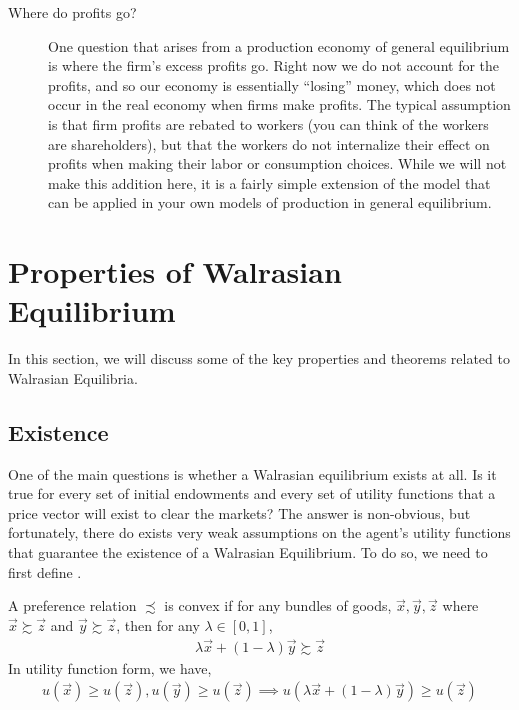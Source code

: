 \begin{description}
    \item[Where do profits go?] One question that arises from a production economy of general equilibrium is where the firm's excess profits go. Right now we do not account for the profits, and so our economy is essentially ``losing'' money, which does not occur in the real economy when firms make profits. The typical assumption is that firm profits are rebated to workers (you can think of the workers are shareholders), but that the workers do not internalize their effect on profits when making their labor or consumption choices. While we will not make this addition here, it is a fairly simple extension of the model that can be applied in your own models of production in general equilibrium.  
\end{description}

\section{Properties of Walrasian Equilibrium}
In this section, we will discuss some of the key properties and theorems related to Walrasian Equilibria.

\subsection*{Existence}
One of the main questions is whether a Walrasian equilibrium exists at all. Is it true for every set of initial endowments and every set of utility functions that a price vector will exist to clear the markets? The answer is non-obvious, but fortunately, there do exists very weak assumptions on the agent's utility functions that guarantee the existence of a Walrasian Equilibrium. To do so, we need to first define .

\begin{definition*}
    A preference relation $\precsim$ is convex if for any bundles of goods, $\vec{x}, \vec{y}, \vec{z}$ where $\vec{x} \succsim \vec{z} $ and $\vec{y} \succsim \vec{z}$, then for any $\lambda \in [0, 1]$,
    \begin{align*}
        \lambda \vec{x} + (1 - \lambda) \vec{y} \succsim \vec{z}
    \end{align*}
    In utility function form, we have,
    \begin{align*}
        u(\vec{x}) \geq u(\vec{z}), u(\vec{y}) \geq u(\vec{z}) \implies u(\lambda \vec{x} + (1 - \lambda)\vec{y}) \geq u(\vec{z})
    \end{align*}
\end{definition*}

